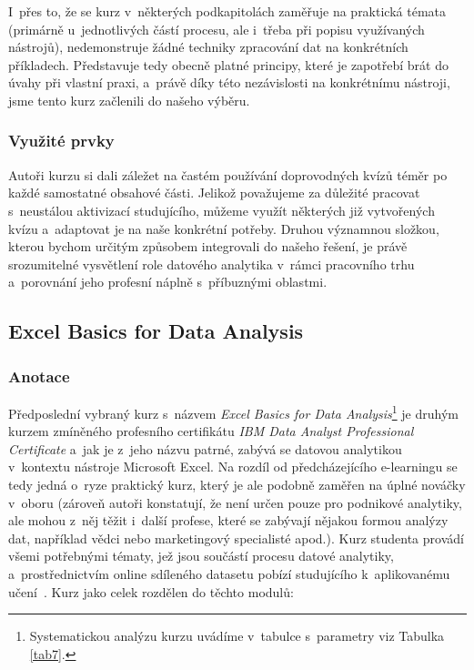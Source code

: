 I~přes to, že se kurz v~některých podkapitolách zaměřuje na praktická témata (primárně u~jednotlivých částí procesu, ale i~třeba při popisu využívaných nástrojů), nedemonstruje žádné techniky zpracování dat na konkrétních příkladech. Představuje tedy obecně platné principy, které je zapotřebí brát do úvahy při vlastní praxi, a~právě díky této nezávislosti na konkrétnímu nástroji, jsme tento kurz začlenili do našeho výběru.

\hypertarget{vyuux17eituxe9-prvky-5}{%
\subsubsection{Využité prvky}\label{vyuux17eituxe9-prvky-5}}

Autoři kurzu si dali záležet na častém používání doprovodných kvízů téměr po každé samostatné obsahové části. Jelikož považujeme za důležité pracovat s~neustálou aktivizací studujícího, můžeme využít některých již vytvořených kvízu a~adaptovat je na naše konkrétní potřeby. Druhou významnou složkou, kterou bychom určitým způsobem integrovali do našeho řešení, je právě srozumitelné vysvětlení role datového analytika v~rámci pracovního trhu a~porovnání jeho profesní náplně s~příbuznými oblastmi.

\hypertarget{excel-basics-for-data-analysis}{%
\subsection{Excel Basics for Data Analysis}\label{excel-basics-for-data-analysis}}

\hypertarget{anotace-5}{%
\subsubsection{Anotace}\label{anotace-5}}

Předposlední vybraný kurz s~názvem \emph{Excel Basics for Data Analysis}\footnote{Systematickou analýzu kurzu uvádíme v~tabulce s~parametry viz Tabulka \ref{tab7}.} je druhým kurzem zmíněného profesního certifikátu \emph{IBM Data Analyst Professional Certificate} a~jak je z~jeho názvu patrné, zabývá se datovou analytikou v~kontextu nástroje Microsoft Excel. Na rozdíl od předcházejícího e-learningu se tedy jedná o~ryze praktický kurz, který je ale podobně zaměřen na úplné nováčky v~oboru (zároveň autoři konstatují, že není určen pouze pro podnikové analytiky, ale mohou z~něj těžit i~další profese, které se zabývají nějakou formou analýzy dat, například vědci nebo marketingový specialisté apod.). Kurz studenta provádí všemi potřebnými tématy, jež jsou součástí procesu datové analytiky, a~prostřednictvím online sdíleného datasetu pobízí studujícího k~aplikovanému učení~\parencite{course7}. Kurz jako celek rozdělen do těchto modulů:

